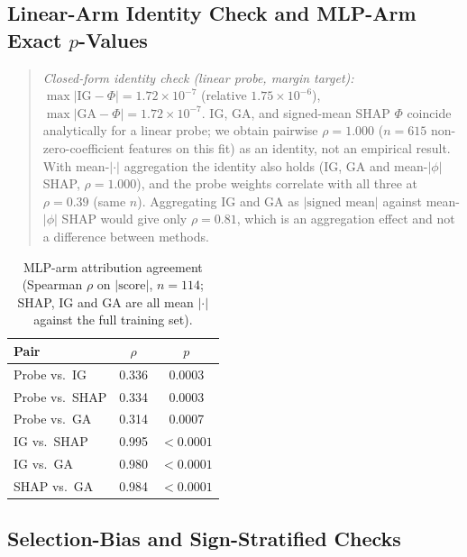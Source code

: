 \subsection{Linear-Arm Identity Check and MLP-Arm Exact $p$-Values}

\begin{quote}
\textit{Closed-form identity check (linear probe, margin target):}
$\max|\mathrm{IG}-\Phi| = 1.72\times10^{-7}$ (relative $1.75\times10^{-6}$),
$\max|\mathrm{GA}-\Phi| = 1.72\times10^{-7}$. IG, GA, and
signed-mean SHAP $\Phi$ coincide analytically for a linear probe; we obtain
pairwise $\rho = 1.000$ ($n=615$ non-zero-coefficient features on this
fit) as an identity, not an empirical result. With mean-$|\cdot|$ aggregation the identity also holds
(IG, GA and mean-$|\phi|$ SHAP, $\rho=1.000$), and the probe weights correlate with
all three at $\rho=0.39$ (same $n$). Aggregating IG and GA as $|\text{signed mean}|$
against mean-$|\phi|$ SHAP would give only $\rho=0.81$, which is an aggregation
effect and not a difference between methods.
\end{quote}

\begin{table}[h]
\centering
\caption{MLP-arm attribution agreement (Spearman $\rho$ on $|\text{score}|$, $n=114$; SHAP, IG and GA are all mean $|\cdot|$ against the full training set).}
\label{tab:app-mlp-ranking}
\begin{tabular}{lcc}
\toprule
Pair & $\rho$ & $p$ \\
\midrule
Probe vs.\ IG   & 0.336 & 0.0003 \\
Probe vs.\ SHAP & 0.334 & 0.0003 \\
Probe vs.\ GA   & 0.314 & 0.0007 \\
IG vs.\ SHAP    & 0.995 & $<0.0001$ \\
IG vs.\ GA      & 0.980 & $<0.0001$ \\
SHAP vs.\ GA    & 0.984 & $<0.0001$ \\
\bottomrule
\end{tabular}
\end{table}
\label{tab:app-identity}

\subsection{Selection-Bias and Sign-Stratified Checks}
\label{app:selection-table}

